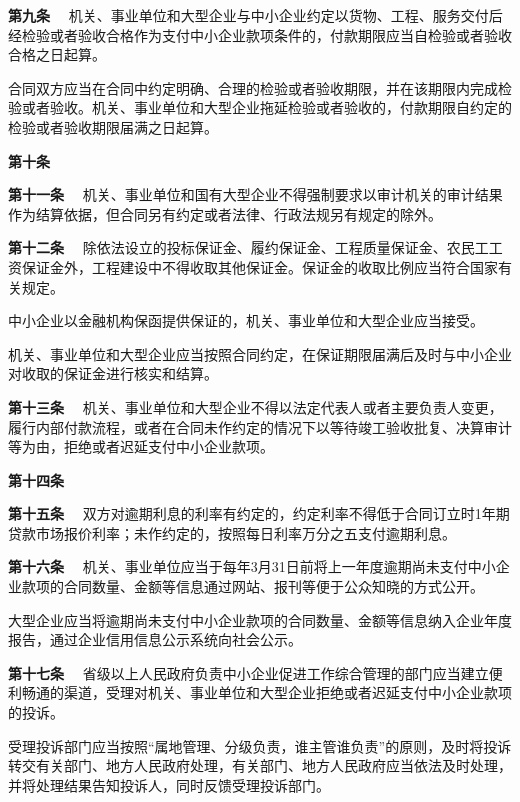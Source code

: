 { \bf 第九条 }　机关、事业单位和大型企业与中小企业约定以货物、工程、服务交付后经检验或者验收合格作为支付中小企业款项条件的，付款期限应当自检验或者验收合格之日起算。

合同双方应当在合同中约定明确、合理的检验或者验收期限，并在该期限内完成检验或者验收。机关、事业单位和大型企业拖延检验或者验收的，付款期限自约定的检验或者验收期限届满之日起算。

{ \bf 第十条 }　

{ \bf 第十一条 }　机关、事业单位和国有大型企业不得强制要求以审计机关的审计结果作为结算依据，但合同另有约定或者法律、行政法规另有规定的除外。

{ \bf 第十二条 }　除依法设立的投标保证金、履约保证金、工程质量保证金、农民工工资保证金外，工程建设中不得收取其他保证金。保证金的收取比例应当符合国家有关规定。

中小企业以金融机构保函提供保证的，机关、事业单位和大型企业应当接受。

机关、事业单位和大型企业应当按照合同约定，在保证期限届满后及时与中小企业对收取的保证金进行核实和结算。

{ \bf 第十三条 }　机关、事业单位和大型企业不得以法定代表人或者主要负责人变更，履行内部付款流程，或者在合同未作约定的情况下以等待竣工验收批复、决算审计等为由，拒绝或者迟延支付中小企业款项。

{ \bf 第十四条 }　

{ \bf 第十五条 }　双方对逾期利息的利率有约定的，约定利率不得低于合同订立时1年期贷款市场报价利率；未作约定的，按照每日利率万分之五支付逾期利息。

{ \bf 第十六条 }　机关、事业单位应当于每年3月31日前将上一年度逾期尚未支付中小企业款项的合同数量、金额等信息通过网站、报刊等便于公众知晓的方式公开。

大型企业应当将逾期尚未支付中小企业款项的合同数量、金额等信息纳入企业年度报告，通过企业信用信息公示系统向社会公示。

{ \bf 第十七条 }　省级以上人民政府负责中小企业促进工作综合管理的部门应当建立便利畅通的渠道，受理对机关、事业单位和大型企业拒绝或者迟延支付中小企业款项的投诉。

受理投诉部门应当按照“属地管理、分级负责，谁主管谁负责”的原则，及时将投诉转交有关部门、地方人民政府处理，有关部门、地方人民政府应当依法及时处理，并将处理结果告知投诉人，同时反馈受理投诉部门。

